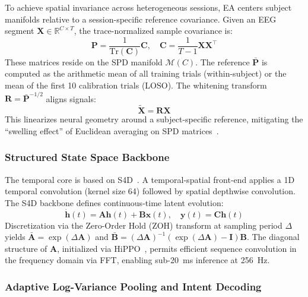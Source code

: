 \documentclass[11pt,a4paper]{article}
\begin{document}
To achieve spatial invariance across heterogeneous sessions, EA centers subject
manifolds relative to a session-specific reference covariance.
Given an EEG segment $\mathbf{X} \in \mathbb{R}^{C \times T}$, the
trace-normalized sample covariance is:
\begin{equation}
    \mathbf{P} = \frac{1}{\mathrm{Tr}(\mathbf{C})} \mathbf{C},
    \quad \mathbf{C} = \frac{1}{T-1} \mathbf{X}\mathbf{X}^\top
\end{equation}
These matrices reside on the SPD manifold $\mathcal{M}(C)$.
The reference $\bar{\mathbf{P}}$ is computed as the arithmetic mean of all
training trials (within-subject) or the mean of the first 10 calibration trials
(LOSO).
The whitening transform $\mathbf{R} = \bar{\mathbf{P}}^{-1/2}$ aligns signals:
\begin{equation}
    \tilde{\mathbf{X}} = \mathbf{R} \mathbf{X}
\end{equation}
This linearizes neural geometry around a subject-specific reference, mitigating
the ``swelling effect'' of Euclidean averaging on SPD
matrices~\cite{Barachant2010}.

\subsubsection{Structured State Space Backbone}

The temporal core is based on S4D~\cite{Gu2022}.
A temporal-spatial front-end applies a 1D temporal convolution (kernel size 64)
followed by spatial depthwise convolution.
The S4D backbone defines continuous-time latent evolution:
\begin{equation}
    \dot{\mathbf{h}}(t) = \mathbf{A}\mathbf{h}(t) + \mathbf{B}\mathbf{x}(t),
    \quad \mathbf{y}(t) = \mathbf{C}\mathbf{h}(t)
\end{equation}
Discretization via the Zero-Order Hold (ZOH) transform at sampling period
$\Delta$ yields $\bar{\mathbf{A}} = \exp(\Delta\mathbf{A})$ and
$\bar{\mathbf{B}} = (\Delta\mathbf{A})^{-1}(\exp(\Delta\mathbf{A}) -
\mathbf{I})\mathbf{B}$.
The diagonal structure of $\mathbf{A}$, initialized via
HiPPO~\cite{Gu2021}, permits efficient sequence convolution in the frequency
domain via FFT, enabling sub-20~ms inference at 256~Hz.

\subsubsection{Adaptive Log-Variance Pooling and Intent Decoding}
\end{document}
